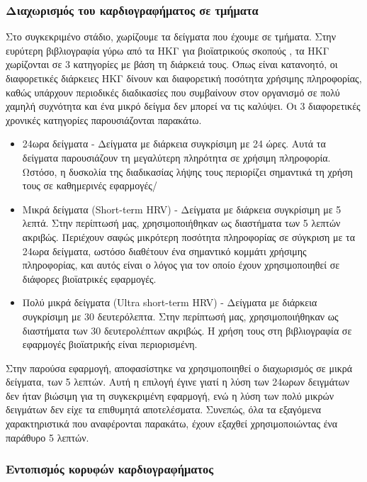 \subsubsection{Διαχωρισμός του καρδιογραφήματος σε τμήματα}
Στο συγκεκριμένο στάδιο, χωρίζουμε τα δείγματα που έχουμε σε τμήματα. Στην ευρύτερη βιβλιογραφία γύρω από τα ΗΚΓ για βιοϊατρικούς σκοπούς \cite{hrv_overview}, τα ΗΚΓ χωρίζονται σε 3 κατηγορίες με βάση τη διάρκειά τους. Όπως είναι κατανοητό, οι διαφορετικές διάρκειες ΗΚΓ δίνουν και διαφορετική ποσότητα χρήσιμης πληροφορίας, καθώς υπάρχουν περιοδικές διαδικασίες που συμβαίνουν στον οργανισμό σε πολύ χαμηλή συχνότητα και ένα μικρό δείγμα δεν μπορεί να τις καλύψει. Οι 3 διαφορετικές χρονικές κατηγορίες παρουσιάζονται παρακάτω.
\begin{itemize}
    \item 24ωρα δείγματα - Δείγματα με διάρκεια συγκρίσιμη με 24 ώρες. Αυτά τα δείγματα παρουσιάζουν τη μεγαλύτερη πληρότητα σε χρήσιμη πληροφορία. Ωστόσο, η δυσκολία της διαδικασίας λήψης τους περιορίζει σημαντικά τη χρήση τους σε καθημερινές εφαρμογές/
    \item Μικρά δείγματα (Short-term HRV) - Δείγματα με διάρκεια συγκρίσιμη με 5 λεπτά. Στην περίπτωσή μας, χρησιμοποιήθηκαν ως διαστήματα των 5 λεπτών ακριβώς. Περιέχουν σαφώς μικρότερη ποσότητα πληροφορίας σε σύγκριση με τα 24ωρα δείγματα, ωστόσο διαθέτουν ένα σημαντικό κομμάτι χρήσιμης πληροφορίας, και αυτός είναι ο λόγος για τον οποίο έχουν χρησιμοποιηθεί σε διάφορες βιοϊατρικές εφαρμογές.
    \item Πολύ μικρά δείγματα (Ultra short-term HRV) - Δείγματα με διάρκεια συγκρίσιμη με 30 δευτερόλεπτα. Στην περίπτωσή μας, χρησιμοποιήθηκαν ως διαστήματα των 30 δευτερολέπτων ακριβώς. Η χρήση τους στη βιβλιογραφία σε εφαρμογές βιοϊατρικής είναι περιορισμένη.
\end{itemize}

Στην παρούσα εφαρμογή, αποφασίστηκε να χρησιμοποιηθεί ο διαχωρισμός σε μικρά δείγματα, των 5 λεπτών. Αυτή η επιλογή έγινε γιατί η λύση των 24ωρων δειγμάτων δεν ήταν βιώσιμη για τη συγκεκριμένη εφαρμογή, ενώ η λύση των πολύ μικρών δειγμάτων δεν είχε τα επιθυμητά αποτελέσματα. Συνεπώς, όλα τα εξαγόμενα χαρακτηριστικά που αναφέρονται παρακάτω, έχουν εξαχθεί χρησιμοποιώντας ένα παράθυρο 5 λεπτών.

\subsubsection{Εντοπισμός κορυφών καρδιογραφήματος}

